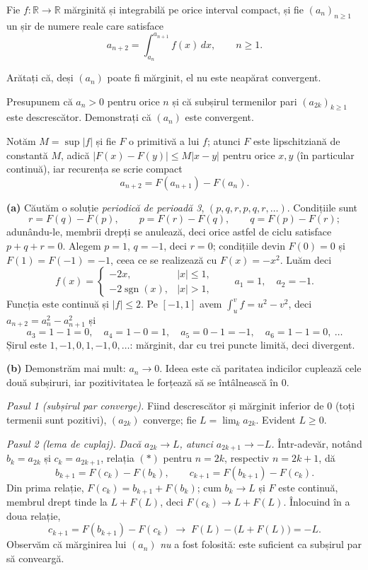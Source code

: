 Fie $f:\mathbb{R}\to\mathbb{R}$ mărginită și integrabilă pe orice interval
compact, și fie $(a_n)_{n\ge1}$ un șir de numere reale care satisface
\[ a_{n+2}=\int_{a_n}^{a_{n+1}}f(x)\,dx,\qquad n\ge1. \]
\begin{parti}
  \item Arătați că, deși $(a_n)$ poate fi mărginit, el nu este neapărat convergent.
  \item Presupunem că $a_n>0$ pentru orice $n$ și că subșirul termenilor pari
        $(a_{2k})_{k\ge1}$ este descrescător. Demonstrați că $(a_n)$ este
        convergent.
\end{parti}
\sol Notăm $M=\sup|f|$ și fie $F$ o primitivă a lui $f$; atunci $F$ este
lipschitziană de constantă $M$, adică $|F(x)-F(y)|\le M|x-y|$ pentru orice
$x,y$ (în particular continuă), iar recurența se scrie compact
\[ a_{n+2}=F(a_{n+1})-F(a_n). \tag{$\ast$} \]

\noindent\textbf{(a)} Căutăm o soluție \emph{periodică de perioadă 3},
$(p,q,r,p,q,r,\dots)$. Condițiile sunt
\[ r=F(q)-F(p),\qquad p=F(r)-F(q),\qquad q=F(p)-F(r); \]
adunându-le, membrii drepți se anulează, deci orice astfel de ciclu satisface
$p+q+r=0$. Alegem $p=1$, $q=-1$, deci $r=0$; condițiile devin $F(0)=0$ și
$F(1)=F(-1)=-1$, ceea ce se realizează cu $F(x)=-x^2$. Luăm deci
\[ f(x)=\begin{cases}-2x, & |x|\le 1,\\[2pt] -2\operatorname{sgn}(x), & |x|>1,\end{cases}
\qquad a_1=1,\quad a_2=-1 . \]
Funcția este continuă și $|f|\le2$. Pe $[-1,1]$ avem $\int_u^v f=u^2-v^2$, deci
$a_{n+2}=a_n^2-a_{n+1}^2$ și
\[ a_3=1-1=0,\quad a_4=1-0=1,\quad a_5=0-1=-1,\quad a_6=1-1=0,\ \dots \]
Șirul este $1,-1,0,1,-1,0,\dots$: mărginit, dar cu trei puncte limită, deci
divergent.

\noindent\textbf{(b)} Demonstrăm mai mult: $a_n\to0$. Ideea este că paritatea
indicilor cuplează cele două subșiruri, iar pozitivitatea le forțează să se
întâlnească în $0$.

\noindent\textit{Pasul 1 (subșirul par converge).} Fiind descrescător și
mărginit inferior de $0$ (toți termenii sunt pozitivi), $(a_{2k})$ converge;
fie $L=\lim_k a_{2k}$. Evident $L\ge0$.

\noindent\textit{Pasul 2 (lema de cuplaj).} \emph{Dacă $a_{2k}\to L$, atunci
$a_{2k+1}\to-L$.} Într-adevăr, notând $b_k=a_{2k}$ și $c_k=a_{2k+1}$, relația
$(\ast)$ pentru $n=2k$, respectiv $n=2k+1$, dă
\[ b_{k+1}=F(c_k)-F(b_k),\qquad c_{k+1}=F(b_{k+1})-F(c_k). \]
Din prima relație, $F(c_k)=b_{k+1}+F(b_k)$; cum $b_k\to L$ și $F$ este continuă,
membrul drept tinde la $L+F(L)$, deci $F(c_k)\to L+F(L)$. Înlocuind în a doua
relație,
\[ c_{k+1}=F(b_{k+1})-F(c_k)\;\longrightarrow\;F(L)-\bigl(L+F(L)\bigr)=-L . \]
Observăm că mărginirea lui $(a_n)$ \emph{nu} a fost folosită: este suficient ca
subșirul par să conveargă.

